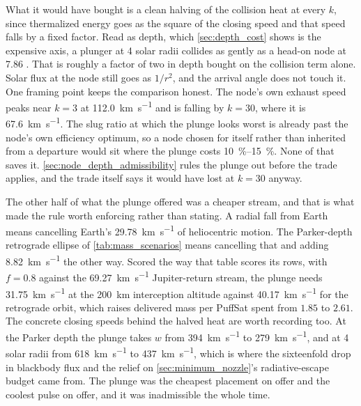 \documentclass{article}
\begin{document}
What it would have bought is a clean halving of the collision heat at every $k$, since thermalized energy goes as the square of the closing speed and that speed falls by a fixed factor. Read as depth, which \autoref{sec:depth_cost} shows is the expensive axis, a plunger at 4 solar radii collides as gently as a head-on node at \num{7.86} \cite{Katz_aim_is_all_you_need_2025}. That is roughly a factor of two in depth bought on the collision term alone. Solar flux at the node still goes as $1/r^2$, and the arrival angle does not touch it. One framing point keeps the comparison honest. The node's own exhaust speed peaks near $k = 3$ at \SI{112.0}{\kilo\meter\per\second} and is falling by $k = 30$, where it is \SI{67.6}{\kilo\meter\per\second}. The slug ratio at which the plunge looks worst is already past the node's own efficiency optimum, so a node chosen for itself rather than inherited from a departure would sit where the plunge costs \SIrange{10}{15}{\percent}. None of that saves it. \autoref{sec:node_depth_admissibility} rules the plunge out before the trade applies, and the trade itself says it would have lost at $k = 30$ anyway.

The other half of what the plunge offered was a cheaper stream, and that is what made the rule worth enforcing rather than stating. A radial fall from Earth means cancelling Earth's \SI{29.78}{\kilo\meter\per\second} of heliocentric motion. The Parker-depth retrograde ellipse of \autoref{tab:mass_scenarios} means cancelling that and adding \SI{8.82}{\kilo\meter\per\second} the other way. Scored the way that table scores its rows, with $f = 0.8$ against the \SI{69.27}{\kilo\meter\per\second} Jupiter-return stream, the plunge needs \SI{31.75}{\kilo\meter\per\second} at the \SI{200}{\kilo\meter} interception altitude against \SI{40.17}{\kilo\meter\per\second} for the retrograde orbit, which raises delivered mass per PuffSat spent from $1.85$ to $2.61$. The concrete closing speeds behind the halved heat are worth recording too. At the Parker depth the plunge takes $w$ from \SI{394}{\kilo\meter\per\second} to \SI{279}{\kilo\meter\per\second}, and at 4 solar radii from \SI{618}{\kilo\meter\per\second} to \SI{437}{\kilo\meter\per\second}, which is where the sixteenfold drop in blackbody flux and the relief on \autoref{sec:minimum_nozzle}'s radiative-escape budget came from. The plunge was the cheapest placement on offer and the coolest pulse on offer, and it was inadmissible the whole time.
\end{document}
